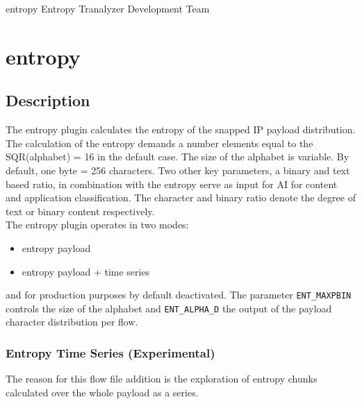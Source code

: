 \documentclass[documentation]{subfiles}
\begin{document}
\trantitle
    {entropy}
    {Entropy}
    {Tranalyzer Development Team}

\section{entropy}\label{s:entropy}

\subsection{Description}
The entropy plugin calculates the entropy of the snapped IP payload distribution.
The calculation of the entropy demands a number elements equal to the SQR(alphabet) = 16 in the default case.
The size of the alphabet is variable. By default, one byte = 256 characters.
Two other key parameters, a binary and text based ratio, in combination with the entropy serve as input for AI for content and application classification. The character and binary ratio denote the degree of text or binary content respectively. \\

The entropy plugin operates in two modes:
\begin{itemize}
    \item entropy payload
    \item entropy payload + time series
\end{itemize}

and for production purposes by default deactivated. The parameter {\tt ENT\_MAXPBIN} controls the
size of the alphabet and {\tt ENT\_ALPHA\_D} the output of the payload character distribution per flow.

\subsubsection{Entropy Time Series (Experimental)}
The reason for this flow file addition is the exploration of entropy chunks
calculated over the whole payload as a series.
\end{document}
